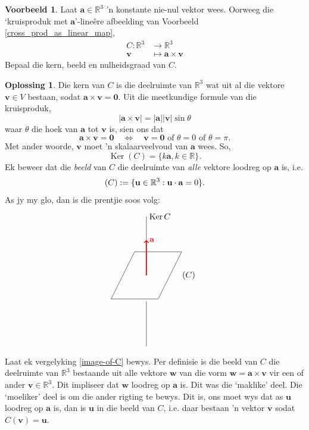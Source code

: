 \documentclass[a4paper,11pt]{book}
\theoremstyle{definition}
\newtheorem{example_environment}{Voorbeeld}[chapter]
\newtheorem*{solution}{Oplossing}
\newcommand{\ve}[1]{\mathbf{#1}}
\newenvironment{example}
	{
		\begin{oframed}
		\begin{example_environment}
	}
	{
		\end{example_environment}
		\end{oframed}
	}
\DeclareMathOperator{\Ker}{Ker}
\let\Im\relax
\DeclareMathOperator{\Im}{Im} %
\begin{document}
\begin{example} \label{cross-product-example} Laat $\ve{a} \in
	\mathbb{R}^3$ 'n konstante nie-nul vektor
	wees. Oorweeg die `kruisproduk met $\ve{a}$'-line{\^e}re afbeelding van
	Voorbeeld \ref{cross_prod_as_linear_map},
	\begin{align*}
		C : \mathbb{R}^3 & \rightarrow \mathbb{R}^3  \\
		\ve{v} &\mapsto \ve{a} \times \ve{v}
	\end{align*}
	Bepaal die kern, beeld en nulheidsgraad van $C$.
	\begin{solution} Die kern van $C$ is die deelruimte van $\mathbb{R}^3$
		wat uit al die vektore $\ve{v} \in V$ bestaan, sodat $\ve{a} \times
		\ve{v} = \ve{0}$. Uit die meetkundige formule van die kruisproduk,
		\[
			|\ve{a} \times \ve{v}| = |\ve{a}| |\ve{v}| \sin \theta
		\]
		waar $\theta$ die hoek van $\ve{a}$ tot $\ve{v}$ is, sien ons dat 
		\[
			\ve{a} \times \ve{v} = \ve{0} \quad \Leftrightarrow \quad
			\mbox{$\ve{v}=\ve{0}$ of $\theta = 0$ of $\theta= \pi$}.
		\]
		Met ander woorde, $\ve{v}$ moet 'n skalaarveelvoud van $\ve{a}$
		wees. So,
		\[
			\Ker(C) = \{ k \ve{a}, k \in \mathbb{R} \}.
		\]  
		Ek beweer dat die \emph{beeld} van $C$ die deelruimte van
		\emph{alle} vektore loodreg op $\ve{a}$ is, i.e.
		\begin{equation} \label{image-of-C} 
			\Im(C) := \{ \ve{u} \in \mathbb{R}^3 : \ve{u} \cdot \ve{a} = 0
			\}.
		\end{equation}
		As jy my glo, dan is die prentjie soos volg:
		\[
			\begin{tikzpicture}
				\draw (0,0) -- (1,2) -- (3,2) -- (2,0) -- (0,0);
				\draw (1.5, 1) -- (1.5,3.5) node[right] {$\Ker{C}$};
				\draw (1.5, -0.1) -- (1.5, -2);
				\node at (3.3, 1) {$\Im(C)$};	
				\draw[very thick, red, ->] (1.5,1) -- (1.5, 2.5)
				node[right] {$\ve{a}$};
			\end{tikzpicture}
		\]
		Laat ek vergelyking \eqref{image-of-C} bewys. Per definisie is die
		beeld van $C$ die deelruimte van $\mathbb{R}^3$ bestaande uit alle
		vektore $\ve{w}$ van die vorm $\ve{w} = \ve{a} \times \ve{v}$ vir
		een of ander $\ve{v} \in \mathbb{R}^3$. Dit impliseer dat $\ve{w}$
		loodreg op $\ve{a}$ is. Dit was die `maklike' deel. Die `moeliker'
		deel is om die ander rigting te bewys. Dit is, ons moet wys dat as
		$\ve{u}$ loodreg op $\ve{a}$ is, dan is $\ve{u}$ in die beeld van
		$C$, i.e. daar bestaan 'n vektor $\ve{v}$ sodat $C(\ve{v}) =
		\ve{u}$.


\end{solution}
\end{example}
\end{document}

